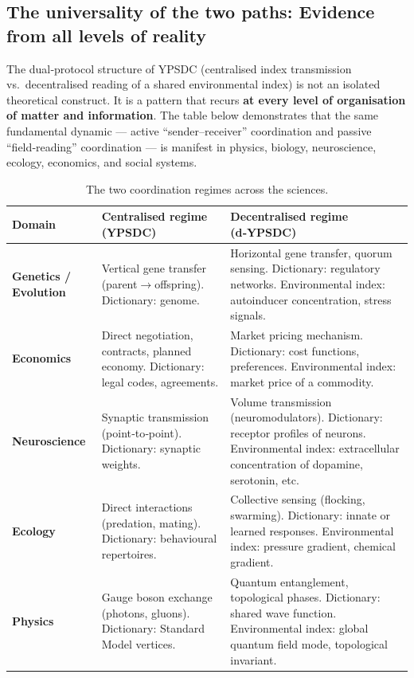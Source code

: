 \documentclass[11pt,a4paper]{article}
\begin{document}
\subsection{The universality of the two paths: Evidence from all levels of reality}
\label{subsec:universality-two-paths}

The dual‑protocol structure of YPSDC (centralised index transmission vs.\
decentralised reading of a shared environmental index) is not an isolated
theoretical construct. It is a pattern that recurs \textbf{at every level of
	organisation of matter and information}. The table below demonstrates that
the same fundamental dynamic — active ``sender–receiver'' coordination and
passive ``field‑reading'' coordination — is manifest in physics, biology,
neuroscience, ecology, economics, and social systems.

\begin{table}[htbp]
	\centering
	\caption{The two coordination regimes across the sciences.}
	\label{tab:two-regimes-sciences}
	\large
	\begin{tabular}{p{3.0cm}p{5.5cm}p{6.5cm}}
		\toprule
		\textbf{Domain} & \textbf{Centralised regime (YPSDC)} & \textbf{Decentralised regime (d‑YPSDC)} \\
		\midrule
		\textbf{Genetics / Evolution} &
		Vertical gene transfer (parent$\to$offspring).
		Dictionary: genome. &
		Horizontal gene transfer, quorum sensing.
		Dictionary: regulatory networks.
		Environmental index: autoinducer concentration, stress signals. \\
		\midrule
		\textbf{Economics} &
		Direct negotiation, contracts, planned economy.
		Dictionary: legal codes, agreements. &
		Market pricing mechanism.
		Dictionary: cost functions, preferences.
		Environmental index: market price of a commodity. \\
		\midrule
		\textbf{Neuroscience} &
		Synaptic transmission (point‑to‑point).
		Dictionary: synaptic weights. &
		Volume transmission (neuromodulators).
		Dictionary: receptor profiles of neurons.
		Environmental index: extracellular concentration of dopamine, serotonin, etc. \\
		\midrule
		\textbf{Ecology} &
		Direct interactions (predation, mating).
		Dictionary: behavioural repertoires. &
		Collective sensing (flocking, swarming).
		Dictionary: innate or learned responses.
		Environmental index: pressure gradient, chemical gradient. \\
		\midrule
		\textbf{Physics} &
		Gauge boson exchange (photons, gluons).
		Dictionary: Standard Model vertices. &
		Quantum entanglement, topological phases.
		Dictionary: shared wave function.
		Environmental index: global quantum field mode, topological invariant. \\
		\bottomrule
	\end{tabular}
\end{table}
\end{document}
